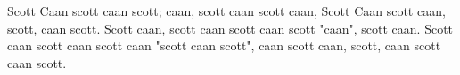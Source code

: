 % 
% 
%
Scott Caan scott caan scott; caan, scott caan scott caan, Scott Caan scott caan, scott, caan scott. Scott caan, scott caan scott caan scott "caan", scott caan. Scott caan scott caan scott caan "scott caan scott", caan scott caan, scott, caan scott caan scott.